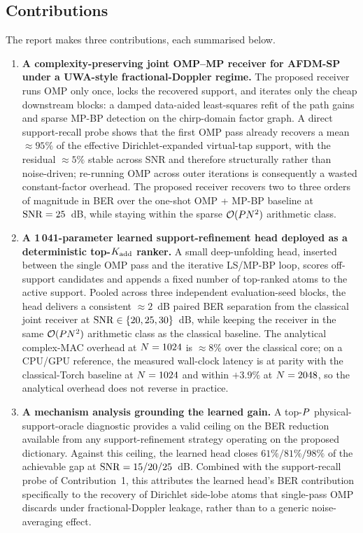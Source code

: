 \subsection{Contributions}
\label{ssec:contrib}

The report makes three contributions, each summarised below.

\begin{enumerate}[leftmargin=1.3em,itemsep=2pt]
\item \textbf{A complexity-preserving joint OMP--MP receiver for AFDM-SP under a
UWA-style fractional-Doppler regime.} The proposed receiver runs OMP only
once, locks the recovered support, and iterates only the cheap downstream
blocks: a damped data-aided least-squares refit of the path gains and sparse
MP-BP detection on the chirp-domain factor graph. A direct support-recall
probe shows that the first OMP pass already recovers a mean $\approx 95\%$ of
the effective Dirichlet-expanded virtual-tap support, with the residual
$\approx 5\%$ stable across SNR and therefore structurally rather than
noise-driven; re-running OMP across outer iterations is consequently a wasted
constant-factor overhead. The proposed receiver recovers two to three orders
of magnitude in BER over the one-shot OMP + MP-BP baseline at $\mathrm{SNR} = 25$~dB,
while staying within the sparse $\mathcal{O}(P N^2)$ arithmetic
class.

\item \textbf{A 1\,041-parameter learned support-refinement head deployed as a
deterministic top-$K_{\mathrm{add}}$ ranker.} A small deep-unfolding head, inserted
between the single OMP pass and the iterative LS/MP-BP loop, scores
off-support candidates and appends a fixed number of top-ranked atoms to the
active support. Pooled across three independent evaluation-seed blocks, the
head delivers a consistent $\approx 2$~dB paired BER separation from the
classical joint receiver at $\mathrm{SNR} \in \{20, 25, 30\}$~dB, while keeping the
receiver in the same $\mathcal{O}(P N^2)$ arithmetic class as the
classical baseline. The analytical complex-MAC overhead at $N = 1024$ is
$\approx 8\%$ over the classical core; on a CPU/GPU reference,
the measured wall-clock latency is at parity with the classical-Torch baseline
at $N = 1024$ and within $+3.9\%$ at $N = 2048$, so the analytical
overhead does not reverse in practice.

\item \textbf{A mechanism analysis grounding the learned gain.} A
top-$P$ physical-support-oracle diagnostic provides a valid ceiling on
the BER reduction available from any support-refinement strategy operating on
the proposed dictionary. Against this ceiling, the learned head closes
$61\%/81\%/98\%$ of the achievable gap at $\mathrm{SNR} = 15/20/25$~dB. Combined with
the support-recall probe of Contribution~1, this attributes the learned
head's BER contribution specifically to the recovery of Dirichlet side-lobe
atoms that single-pass OMP discards under fractional-Doppler leakage, rather
than to a generic noise-averaging effect.
\end{enumerate}


